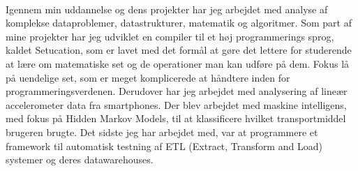 \\
Igennem min uddannelse og dens projekter har jeg arbejdet med analyse af komplekse dataproblemer, datastrukturer, matematik og algoritmer. 
Som part af mine projekter har jeg udviklet en compiler til et høj programmerings sprog, kaldet Setucation, som er lavet med det formål at gøre det lettere for studerende at lære om matematiske set og de operationer man kan udføre på dem. Fokus lå på uendelige set, som er meget komplicerede at håndtere inden for programmeringsverdenen.
Derudover har jeg arbejdet med analysering af lineær accelerometer data fra smartphones. Der blev arbejdet med maskine intelligens, med fokus på Hidden Markov Models, til at klassificere hvilket transportmiddel brugeren brugte. 
Det sidste jeg har arbejdet med, var at programmere et framework til automatisk testning af ETL (Extract, Transform and Load) systemer og deres datawarehouses.






